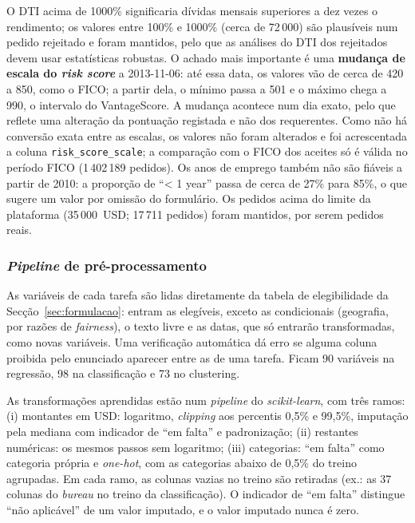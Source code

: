 O DTI acima de 1000\% significaria dívidas mensais superiores a dez vezes o rendimento; os
valores entre 100\% e 1000\% (cerca de 72\,000) são plausíveis num pedido rejeitado e foram
mantidos, pelo que as análises do DTI dos rejeitados devem usar estatísticas robustas. O
achado mais importante é uma \textbf{mudança de escala do \textit{risk score}} a
2013-11-06: até essa data, os valores vão de cerca de 420 a 850, como o FICO; a partir dela,
o mínimo passa a 501 e o máximo chega a 990, o intervalo do VantageScore. A mudança
acontece num dia exato, pelo que reflete uma alteração da pontuação registada e não dos
requerentes. Como não há conversão exata entre as escalas, os valores não foram alterados e
foi acrescentada a coluna \texttt{risk\_score\_scale}; a comparação com o FICO dos aceites só
é válida no período FICO (1\,402\,189 pedidos). Os anos de emprego também não são fiáveis
a partir de 2010: a proporção de ``< 1 year'' passa de cerca de 27\% para 85\%, o que
sugere um valor por omissão do formulário. Os pedidos acima do limite da plataforma
(35\,000~USD; 17\,711 pedidos) foram mantidos, por serem pedidos reais.

\subsubsection{\textit{Pipeline} de pré-processamento}

As variáveis de cada tarefa são lidas diretamente da tabela de elegibilidade da Secção~\ref{sec:formulacao}:
entram as elegíveis, exceto as condicionais (geografia, por razões de \textit{fairness}), o
texto livre e as datas, que só entrarão transformadas, como novas variáveis. Uma verificação
automática dá erro se alguma coluna proibida pelo enunciado aparecer entre as de uma tarefa.
Ficam 90 variáveis na regressão, 98 na classificação e 73 no clustering.

As transformações aprendidas estão num \textit{pipeline} do \textit{scikit-learn}, com três
ramos: (i) montantes em USD: logaritmo, \textit{clipping} aos percentis 0,5\% e 99,5\%,
imputação pela mediana com indicador de ``em falta'' e padronização; (ii) restantes
numéricas: os mesmos passos sem logaritmo; (iii) categorias: ``em falta'' como categoria
própria e \textit{one-hot}, com as categorias abaixo de 0,5\% do treino agrupadas. Em cada
ramo, as colunas vazias no treino são retiradas (ex.: as 37 colunas do \textit{bureau} no
treino da classificação). O indicador de ``em falta'' distingue ``não aplicável'' de um
valor imputado, e o valor imputado nunca é zero.

